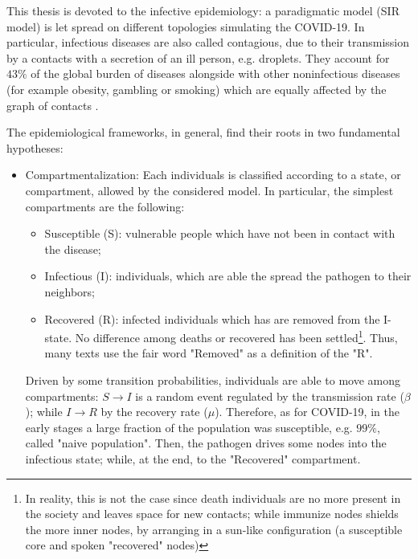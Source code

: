 \documentclass[a4paper,10pt]{book} %
\theoremstyle{definition}
\begin{document}
This thesis is devoted to the infective epidemiology: a paradigmatic model (SIR model) is let spread on different topologies simulating the COVID-19. In particular, infectious diseases are also called contagious, due to their transmission by a contacts with a secretion of an ill person, e.g. droplets. They account for $43\%$ of the global burden of diseases alongside with other noninfectious diseases (for example obesity, gambling or smoking) which are equally affected by the graph of contacts \cite{barabasi::2016networkbook}.

The epidemiological frameworks, in general, find their roots in two fundamental hypotheses:
\begin{itemize}
	\item Compartmentalization: Each individuals is classified according to a state, or compartment, allowed by the considered model. In particular, the simplest compartments are the following:
	\begin{itemize}
		\item Susceptible (S): vulnerable people which have not been in contact with the disease;
		\item Infectious (I): individuals, which are able the spread the pathogen to their neighbors;
		\item Recovered (R): infected individuals which has are removed from the I-state. No difference among deaths or recovered has been settled\footnote{In reality, this is not the case since death individuals are no more present in the society and leaves space for new contacts; while immunize nodes shields the more inner nodes, by arranging in a sun-like configuration (a susceptible core and spoken "recovered" nodes)}. Thus, many texts use the fair word "Removed" as a definition of the "R".
	\end{itemize}
	
	Driven by some transition probabilities, individuals are able to move among compartments: $S \rightarrow I$ is a random event regulated by the transmission rate ($\beta$); while $I \rightarrow R$ by the recovery rate ($\mu$). Therefore, as for COVID-19, in the early stages a large fraction of the population was susceptible, e.g. $99\%$, called "naive population". Then, the pathogen drives some nodes into the infectious state; while, at the end, to the "Recovered" compartment.


\end{itemize}
\end{document}
